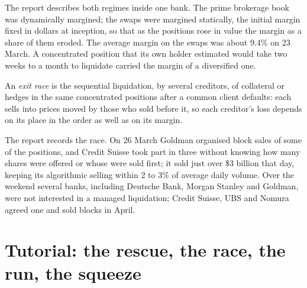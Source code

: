 The report describes both regimes inside one bank. The prime brokerage book was dynamically margined; the swaps were margined statically, the initial
margin fixed in dollars at inception, so that as the positions rose in value the margin as a share of them eroded. The average margin on the swaps was
about 9.4\% on 23 March. A concentrated position that its own holder estimated would take two weeks to a month to liquidate carried the margin of a
diversified one.

\begin{definition}\label{def:fm:case-studies-ii:race}
An \emph{exit race} is the sequential liquidation, by several creditors, of collateral or hedges in the same concentrated positions
after a common client defaults: each sells into prices moved by those who sold before it, so each creditor's loss depends on its place in the order as
well as on its margin.
\end{definition}

The report records the race. On 26 March Goldman organised block sales of some of the positions, and Credit Suisse took part in three without knowing
how many shares were offered or whose were sold first; it sold just over \$3 billion that day, keeping its algorithmic selling within 2 to 3\% of
average daily volume. Over the weekend several banks, including Deutsche Bank, Morgan Stanley and Goldman, were not interested in a managed
liquidation; Credit Suisse, UBS and Nomura agreed one and sold blocks in April.

\section{Tutorial: the rescue, the race, the run, the squeeze}\label{tut:fm:case-studies-ii:tut}

